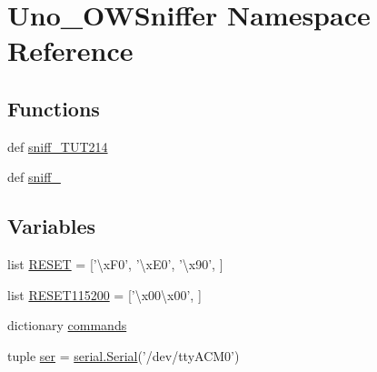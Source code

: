 \hypertarget{namespaceUno__OWSniffer}{\section{Uno\-\_\-\-O\-W\-Sniffer Namespace Reference}
\label{namespaceUno__OWSniffer}
}
\subsection*{Functions}
\begin{DoxyCompactItemize}
\item 
def \hyperlink{namespaceUno__OWSniffer_ab9b7dbfd72b7d37ee84523977c52fc53}{sniff\-\_\-\-T\-U\-T214}
\item 
def \hyperlink{namespaceUno__OWSniffer_adafc8a4e9025e3c731c0d0c50e475350}{sniff\-\_}
\end{DoxyCompactItemize}
\subsection*{Variables}
\begin{DoxyCompactItemize}
\item 
list \hyperlink{namespaceUno__OWSniffer_a0c1cd33218ffd203a838f4c363260b49}{R\-E\-S\-E\-T} = \mbox{[}'\textbackslash{}x\-F0', '\textbackslash{}x\-E0', '\textbackslash{}x90', \mbox{]}
\item 
list \hyperlink{namespaceUno__OWSniffer_a81c5acf2bd7c14bbe7f42d298aecdbb2}{R\-E\-S\-E\-T115200} = \mbox{[}'\textbackslash{}x00\textbackslash{}x00', \mbox{]}
\item 
dictionary \hyperlink{namespaceUno__OWSniffer_acad62719eb322f74fd0ad2b3189cef0a}{commands}
\item 
tuple \hyperlink{namespaceUno__OWSniffer_a89deaca78d0f86d69cd8825306cf0ac2}{ser} = \hyperlink{HardwareSerial_8h_a7b8c4a195c58f9eb8750e94955c5aa4b}{serial.\-Serial}('/dev/tty\-A\-C\-M0')
\end{DoxyCompactItemize}


